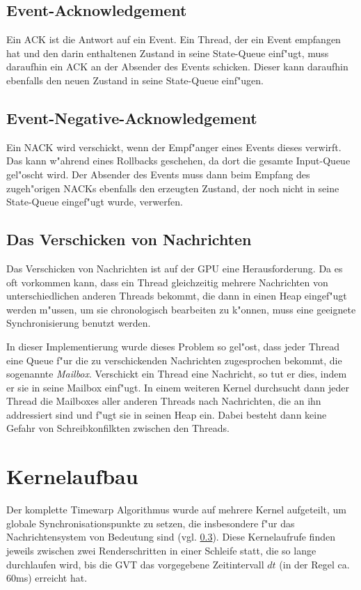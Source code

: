 \documentclass[a4paper, 10pt, openright, parskip, chapterprefix]{scrreprt}
\begin{document}
\subsection{Event-Acknowledgement}
Ein ACK ist die Antwort auf ein Event. Ein Thread, der ein Event empfangen hat und den darin enthaltenen Zustand in
seine State-Queue einf"ugt, muss daraufhin ein ACK an der Absender des Events schicken. Dieser kann daraufhin
ebenfalls den neuen Zustand in seine State-Queue einf"ugen.

\subsection{Event-Negative-Acknowledgement}
Ein NACK wird verschickt, wenn der Empf"anger eines Events dieses verwirft. Das kann w"ahrend eines Rollbacks geschehen,
da dort die gesamte Input-Queue gel"oscht wird. Der Absender des Events muss dann beim Empfang des zugeh"origen NACKs
ebenfalls den erzeugten Zustand, der noch nicht in seine State-Queue eingef"ugt wurde, verwerfen.

\subsection{Das Verschicken von Nachrichten}
\label{subsec:VerschickenVonNachrichten}
Das Verschicken von Nachrichten ist auf der GPU eine Herausforderung. Da es oft vorkommen kann, dass ein Thread
gleichzeitig mehrere Nachrichten von unterschiedlichen anderen Threads bekommt, die dann in einen Heap eingef"ugt werden
m"ussen, um sie chronologisch bearbeiten zu k"onnen, muss eine geeignete Synchronisierung
benutzt werden. 

In dieser Implementierung wurde dieses Problem so gel"ost, dass jeder Thread eine Queue f"ur die zu verschickenden
Nachrichten zugesprochen bekommt, die sogenannte \emph{Mailbox}. Verschickt ein Thread eine Nachricht, so tut er dies,
indem er sie in seine Mailbox einf"ugt.
In einem weiteren
Kernel durchsucht dann jeder Thread die Mailboxes aller anderen Threads nach Nachrichten, die an ihn addressiert sind
und f"ugt sie in seinen Heap ein. Dabei besteht dann keine Gefahr von Schreibkonfilkten zwischen den Threads.


\section{Kernelaufbau}
\label{sec:Kernelaufbau}
Der komplette Timewarp Algorithmus wurde auf mehrere Kernel aufgeteilt, um globale Synchronisationspunkte zu setzen, die
insbesondere f"ur das Nachrichtensystem von Bedeutung sind (vgl. \ref{subsec:VerschickenVonNachrichten}).
Diese Kernelaufrufe finden jeweils zwischen zwei Renderschritten in einer Schleife statt, die so lange durchlaufen wird,
bis die GVT das vorgegebene Zeitintervall $dt$ (in der Regel ca. 60ms) erreicht hat.
\end{document}
